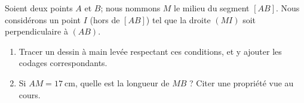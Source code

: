 
\begin{exercice}\label{exo2smath-0082}

    Soient deux points \( A\) et \( B\); nous nommons \( M\) le milieu du segment \( [AB]\). Nous considérons un point \( I\) (hors de \( [AB]\)) tel que la droite \( (MI)\) soit perpendiculaire à \( (AB)\).

    \begin{enumerate}
        \item
            Tracer un dessin à main levée respectant ces conditions, et y ajouter les codages correspondants.
        \item       
            Si \( AM=\SI{17}{\centi\meter}\), quelle est la longueur de \( MB\) ? Citer une propriété vue au cours.
    \end{enumerate}

\end{exercice}
